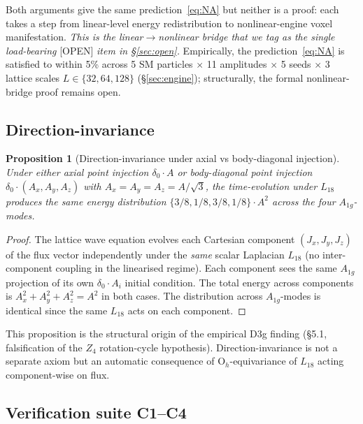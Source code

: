 \documentclass[11pt,reqno]{amsart}
\theoremstyle{plain}
\newtheorem{proposition}[theorem]{Proposition}
\theoremstyle{definition}
\theoremstyle{remark}
\numberwithin{equation}{section}
\newcommand{\Ohgrp}{\mathrm{O}_h}
\newcommand{\Aoneg}{A_{1g}}
\begin{document}
Both arguments give the same prediction~\eqref{eq:NA} but neither is
a proof: each takes a step from linear-level energy redistribution to
nonlinear-engine voxel manifestation. \emph{This is the linear$\to$nonlinear
bridge that we tag as the single load-bearing} [OPEN] \emph{item in
\S\ref{sec:open}.} Empirically, the prediction~\eqref{eq:NA} is
satisfied to within 5\% across 5 SM particles $\times$ 11 amplitudes
$\times$ 5 seeds $\times$ 3 lattice scales $L \in \{32, 64, 128\}$
(\S\ref{sec:engine}); structurally, the formal nonlinear-bridge proof
remains open.

\subsection{Direction-invariance}

\begin{proposition}[Direction-invariance under axial vs body-diagonal
injection]
\label{prop:dir-inv}
Under \emph{either} axial point injection $\delta_{0}\cdot A$
\emph{or} body-diagonal point injection
$\delta_{0}\cdot(A_{x}, A_{y}, A_{z})$ with
$A_{x} = A_{y} = A_{z} = A/\sqrt{3}$, the time-evolution under
$L_{18}$ produces the \emph{same} energy distribution
$\{3/8, 1/8, 3/8, 1/8\}\cdot A^{2}$ across the four $\Aoneg$-modes.
\end{proposition}

\begin{proof}
The lattice wave equation evolves each Cartesian component
$(J_{x}, J_{y}, J_{z})$ of the flux vector independently under the
\emph{same} scalar Laplacian $L_{18}$ (no inter-component coupling
in the linearised regime). Each component sees the same $A_{1g}$
projection of its own $\delta_{0}\cdot A_{i}$ initial condition. The
total energy across components is
$A_{x}^{2} + A_{y}^{2} + A_{z}^{2} = A^{2}$ in both cases. The
distribution across $\Aoneg$-modes is identical since the same
$L_{18}$ acts on each component.
\end{proof}

This proposition is the structural origin of the empirical D3g
finding (\S 5.1, falsification of the $Z_{4}$ rotation-cycle
hypothesis). Direction-invariance is not a separate axiom but an
automatic consequence of $\Ohgrp$-equivariance of $L_{18}$ acting
component-wise on flux.

\subsection{Verification suite C1--C4}
\label{sec:bridge:verify}
\end{document}
